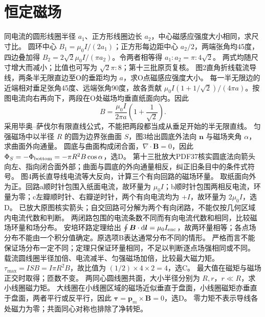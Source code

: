 \section{恒定磁场}
\problemtext 同电流的圆形线圈半径 $a_1$、正方形线圈边长 $a_2$，中心磁感应强度大小相同，求尺寸比。
\workings 圆环中心 $B_1=\mu_0 I/(2a_1)$；正方形每边距中心 $a_2/2$，两端张角均45度，四边叠加得 $B_2=2\sqrt2\mu_0 I/(\pi a_2)$。令两者相等得 $a_1:a_2=\pi:4\sqrt2$。
\crosscheck 两式均随尺寸增大而减小；比值也可写为 $\sqrt2\pi:8$；第十三批原页复核。
\problemtext 图2直角折线载流导线，两条半无限直边至O的垂距均为 $a$，求O点磁感应强度大小。
\workings 每一半无限边的近端相对垂足张角45度、远端张角90度，故各贡献 $\mu_0 I(1+1/\sqrt2)/(4\pi a)$。按图电流向右再向下，两段在O处磁场均垂直纸面向内。因此
\[
B=\frac{\mu_0 I}{2\pi a}\left(1+\frac1{\sqrt2}\right).
\]
\crosscheck 采用毕奥--萨伐尔有限直线公式，不能把两段都当成从垂足开始的半无限直线。
\problemtext 匀强磁场中以半径 $R$ 的圆为边界张曲面 $S$，图3给出圆底外法向 $\bm n$ 与磁场夹角 $\alpha$，求曲面外向通量。
\workings 圆底与曲面构成闭合面，$\nabla\cdot\bm B=0$，因此 $\Phi_S=-\Phi_{\rm bottom}=-\pi R^2B\cos\alpha$，选D。
\crosscheck 第十三批放大PDF37核实圆底法向箭头向左、指向闭合面外部；曲面与圆底的外向通量相反，纠正旧条目中的条件式符号。
\problemtext 图4两长直导线电流等大反向，计算三个有向回路的磁场环量。
\workings 取纸面向外为正。回路a顺时针包围入纸面电流，故环量为 $\mu_0 I$；b顺时针包围两相反电流，环量为零；c左瓣顺时针、右瓣逆时针，两个有向电流均为 $+I$，故环量为 $2\mu_0 I$，选D。
\crosscheck 已放大原图核实箭头；自交回路可分解为两个有向闭路，不能仅按几何区域内电流代数和判断。
\problemtext 两闭路包围的电流条数不同而有向电流代数和相同，比较磁场环量和场分布。
\workings 安培环路定理给出 $\oint\bm B\cdot\mathrm d\bm l=\mu_0 I_{\rm enc}$，故两环量相等；各点场分布不能由一个积分值确定。原选项B表达通常分布不同的情形。
\crosscheck 严格而言不能保证场分布一定不同；定理只保证环量相同，不足以判断逐点场强相同或不同。
\problemtext 载流圆线圈半径加倍、电流减半、匀强磁场加倍，比较最大磁力矩。
\workings $\tau_{\max}=ISB=I\pi R^2B$，故比值为 $(1/2)\times4\times2=4$，选C。
\crosscheck 最大值在磁矩与磁场正交时取得；匝数不变。
\problemtext 两同心圆线圈共面，大小半径分别为 $R,r$，$r\ll R$，求小线圈磁力矩。
\workings 大线圈在小线圈区域的磁场近似垂直于盘面，小线圈磁矩亦垂直于盘面，两者平行或反平行，因此 $\bm\tau=\bm p_m\times\bm B=0$，选D。
\crosscheck 零力矩不表示导线各处磁力为零；共面同心对称也排除了净转矩。

